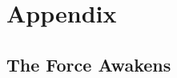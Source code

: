 \chapter{Appendix}
		\label{appendix}


\section{The Force Awakens}

\lipsum[50-55]\cite{Drewitt2015}


